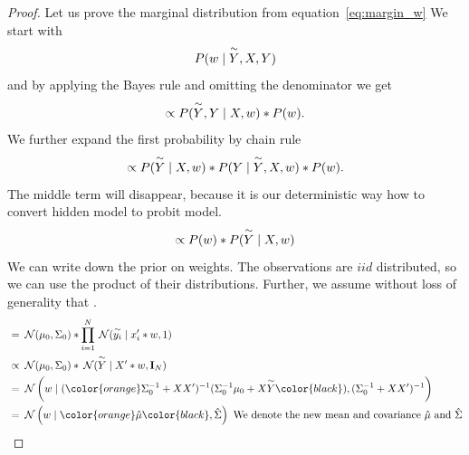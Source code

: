 \begin{proof}
Let us prove the marginal distribution from equation~\ref{eq:margin_w} 
We start with
\begin{equation}
    P(w \mid \overset{\sim}{Y}, X, Y) 
\end{equation}
and by applying the Bayes rule and omitting the denominator we get
\begin{equation}
    \propto   P(\overset{\sim}{Y}, Y \mid X, w) * P(w).
\end{equation}
We further expand the first probability by chain rule
\begin{equation}
    \propto   P(\overset{\sim}{Y} \mid X, w) * P(Y \mid \overset{\sim}{Y},  X, w) * P(w).
\end{equation}
The middle term will disappear, because it is our deterministic way how to convert hidden model to probit model.
\begin{equation}
    \propto   P(w) * P(\overset{\sim}{Y} \mid X, w)
\end{equation}
We can write down the prior on weights. The observations are $iid$ distributed, so we can use the product of their distributions. Further, we assume without loss of generality that .
\begin{align}
    &= \norm(\mu_0, \Sigma_0) * \prod_{i=1}^N \norm(\yh \mid x_i' * w, 1) \\
    &\propto \norm(\mu_0, \Sigma_0) * \norm(\Yh \mid X' * w, \unity_N) \label{eq:w_marg_vect}\\
    &= \norm \left(w  \mid  (\color{orange}\Sigma_0^{-1} + XX')^{-1}(\Sigma_0^{-1}\mu_0 + X\Yh\color{black}), (\Sigma_0^{-1} + XX')^{-1}\right) \label{eq:w_marg_final} \\
    &= \norm \left(w  \mid  \color{orange}\hat{\mu}\color{black}, \hat{\Sigma}\right)  \text{ We denote the new mean and covariance $\hat{\mu}$ and $\hat{\Sigma}$}
\end{align}


\end{proof}
